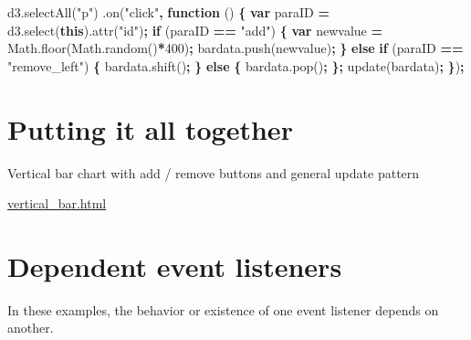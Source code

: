 \documentclass[openany]{book}
\newenvironment{Shaded}{\begin{snugshade}}{\end{snugshade}}
\newcommand{\AttributeTok}[1]{\textcolor[rgb]{0.77,0.63,0.00}{#1}}
\newcommand{\ControlFlowTok}[1]{\textcolor[rgb]{0.13,0.29,0.53}{\textbf{#1}}}
\newcommand{\DecValTok}[1]{\textcolor[rgb]{0.00,0.00,0.81}{#1}}
\newcommand{\KeywordTok}[1]{\textcolor[rgb]{0.13,0.29,0.53}{\textbf{#1}}}
\newcommand{\NormalTok}[1]{#1}
\newcommand{\OperatorTok}[1]{\textcolor[rgb]{0.81,0.36,0.00}{\textbf{#1}}}
\newcommand{\StringTok}[1]{\textcolor[rgb]{0.31,0.60,0.02}{#1}}
\newcommand{\VariableTok}[1]{\textcolor[rgb]{0.00,0.00,0.00}{#1}}
\begin{document}
\begin{Shaded}
\begin{Highlighting}[]
\VariableTok{d3}\NormalTok{.}\AttributeTok{selectAll}\NormalTok{(}\StringTok{"p"}\NormalTok{)}
\NormalTok{    .}\AttributeTok{on}\NormalTok{(}\StringTok{"click"}\OperatorTok{,} \KeywordTok{function}\NormalTok{ () }\OperatorTok{\{}
      \KeywordTok{var}\NormalTok{ paraID }\OperatorTok{=} \VariableTok{d3}\NormalTok{.}\AttributeTok{select}\NormalTok{(}\KeywordTok{this}\NormalTok{).}\AttributeTok{attr}\NormalTok{(}\StringTok{"id"}\NormalTok{)}\OperatorTok{;}
      \ControlFlowTok{if}\NormalTok{ (paraID }\OperatorTok{==} \StringTok{"add"}\NormalTok{) }\OperatorTok{\{}
          \KeywordTok{var}\NormalTok{ newvalue }\OperatorTok{=} \VariableTok{Math}\NormalTok{.}\AttributeTok{floor}\NormalTok{(}\VariableTok{Math}\NormalTok{.}\AttributeTok{random}\NormalTok{()}\OperatorTok{*}\DecValTok{400}\NormalTok{)}\OperatorTok{;}
          \VariableTok{bardata}\NormalTok{.}\AttributeTok{push}\NormalTok{(newvalue)}\OperatorTok{;}
          \OperatorTok{\}} \ControlFlowTok{else} \ControlFlowTok{if}\NormalTok{ (paraID }\OperatorTok{==} \StringTok{"remove_left"}\NormalTok{) }\OperatorTok{\{}
          \VariableTok{bardata}\NormalTok{.}\AttributeTok{shift}\NormalTok{()}\OperatorTok{;}
          \OperatorTok{\}} \ControlFlowTok{else} \OperatorTok{\{}
          \VariableTok{bardata}\NormalTok{.}\AttributeTok{pop}\NormalTok{()}\OperatorTok{;}
          \OperatorTok{\};}
      \AttributeTok{update}\NormalTok{(bardata)}\OperatorTok{;}
      \OperatorTok{\}}\NormalTok{)}\OperatorTok{;}
\end{Highlighting}
\end{Shaded}

\hypertarget{putting-it-all-together}{%
\section{Putting it all together}\label{putting-it-all-together}}

Vertical bar chart with add / remove buttons and general update pattern

\href{code/vertical_bar.html}{vertical\_bar.html}

\hypertarget{dependent-event-listeners}{%
\section{Dependent event listeners}\label{dependent-event-listeners}}

In these examples, the behavior or existence of one event listener depends on another.
\end{document}
